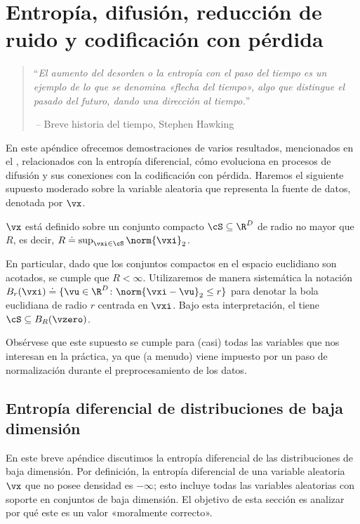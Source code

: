 \documentclass[../../book-main_es.tex]{subfiles}
\begin{document}
\chapter{Entropía, difusión, reducción de ruido y
codificación con pérdida}\label{app:entropy}

\begin{quote}
    ``{\em El aumento del desorden o la entropía con el paso del tiempo es un
        ejemplo de lo que se denomina «flecha del tiempo», algo que
    distingue el pasado del futuro, dando una dirección al tiempo.}''

    $~$\hfill -- Breve historia del tiempo, Stephen Hawking
\end{quote}
\vspace{5mm}

En este apéndice ofrecemos demostraciones de varios resultados, mencionados en el
, relacionados con la entropía diferencial, cómo
evoluciona en procesos de difusión y sus conexiones con la codificación con pérdida. Haremos
el siguiente supuesto moderado sobre la variable aleatoria que representa
la fuente de datos, denotada por \(\vx\).

\begin{assumption}\label{assumption:entropy_x_compact_support}
    \(\vx\) está definido sobre un conjunto compacto \(\cS \subseteq \R^{D}\) de
    radio no mayor que \(R\), es decir, \(R \doteq \sup_{\vxi \in \cS}\norm{\vxi}_{2}\).
\end{assumption}

En particular, dado que los conjuntos compactos en el espacio euclidiano son acotados,
se cumple que \(R < \infty\). Utilizaremos de manera sistemática la notación
\(B_{r}(\vxi) \doteq \{\vu \in \R^{D} \colon \norm{\vxi - \vu}_{2}
\leq r\}\) para denotar la bola euclidiana de radio \(r\) centrada en
\(\vxi\). Bajo esta interpretación, el 
tiene \(\cS \subseteq B_{R}(\vzero)\).

Obsérvese que este supuesto se cumple para (casi) todas las variables que nos interesan
en la práctica, ya que (a menudo) viene impuesto por un paso de normalización
durante el preprocesamiento de los datos.

\section{Entropía diferencial de distribuciones
de baja dimensión}\label{sec:low_dim_entropy}

En este breve apéndice discutimos la entropía diferencial de
las distribuciones de baja dimensión. Por definición, la entropía
diferencial de una variable aleatoria \(\vx\) que no posee densidad
es \(-\infty\); esto incluye todas las variables aleatorias con soporte en
conjuntos de baja dimensión. El objetivo de esta sección es analizar por qué
este es un valor «moralmente correcto».
\end{document}
